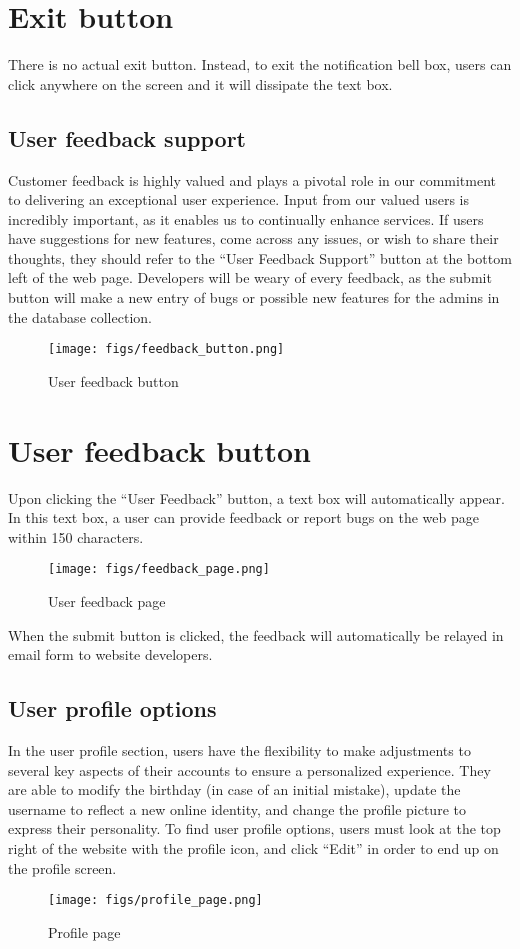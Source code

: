 \documentclass[conference]{IEEEtran}
\begin{document}
\section*{Exit button}
There is no actual exit button. Instead, to exit the notification bell box, users can click anywhere on the screen and it will dissipate the text box. 


\subsection{User feedback support}
Customer feedback is highly valued and plays a pivotal role in our commitment to delivering an exceptional user experience. Input from our valued users is incredibly important, as it enables us to continually enhance services. If users have suggestions for new features, come across any issues, or wish to share their thoughts, they should refer to the “User Feedback Support” button at the bottom left of the web page. Developers will be weary of every feedback, as the submit button will make a new entry of bugs or possible new features for the admins in the database collection. 
    \begin{figure}[H]
    \centering
    \texttt{[image: figs/feedback\_button.png]}
    \caption{User feedback button}
    \label{fig:User feedback button}
    \end{figure}

\section*{User feedback button}
Upon clicking the “User Feedback” button, a text box will automatically appear. In this text box, a user can provide feedback or report bugs on the web page within 150 characters.
    \begin{figure}[H]
    \centering
    \texttt{[image: figs/feedback\_page.png]}
    \caption{User feedback page}
    \label{fig:User feedback page}
    \end{figure}
When the submit button is clicked, the feedback will automatically be relayed in email form to website developers.


\subsection{User profile options}
In the user profile section, users have the flexibility to make adjustments to several key aspects of their accounts to ensure a personalized experience. They are able to modify the birthday (in case of an initial mistake), update the username to reflect a new online identity, and change the profile picture to express their personality. To find user profile options, users must look at the top right of the website with the profile icon, and click “Edit” in order to end up on the profile screen.
    \begin{figure}[H]
    \centering
    \texttt{[image: figs/profile\_page.png]}
    \caption{Profile page}
    \label{fig:Profile page}
    \end{figure}
\end{document}
